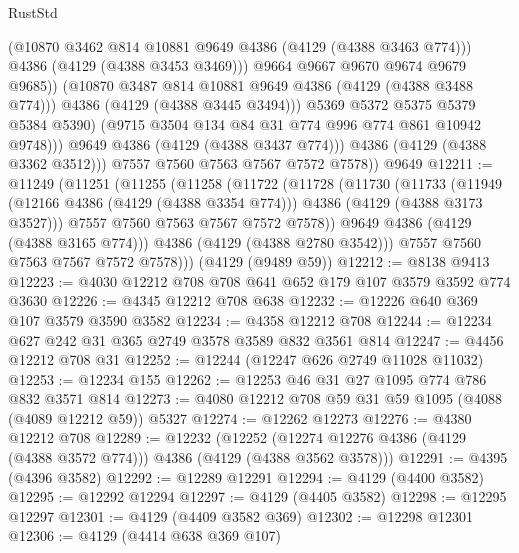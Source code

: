 \begin{lexlean}{RustStd}
\begin{coremodule}
{\begin{coremodule}
{{{{{{{{{{{{{{                          (@10870 @3462 @814 @10881 @9649 @4386 (@4129 (@4388 @3463 @774)))
                          @4386
                          (@4129 (@4388 @3453 @3469)))
                        @9664
                        @9667
                        @9670
                        @9674
                        @9679
                        @9685))
                    (@10870 @3487 @814 @10881 @9649 @4386 (@4129 (@4388 @3488 @774)))
                    @4386
                    (@4129 (@4388 @3445 @3494)))
                  @5369
                  @5372
                  @5375
                  @5379
                  @5384
                  @5390)
                (@9715 @3504 @134 @84 @31 @774 @996 @774 @861 @10942 @9748)))
            @9649
            @4386
            (@4129 (@4388 @3437 @774)))
          @4386
          (@4129 (@4388 @3362 @3512)))
        @7557
        @7560
        @7563
        @7567
        @7572
        @7578))
    @9649
@12211 := @11249
    (@11251
      (@11255
        (@11258
          (@11722
            (@11728
              (@11730
                (@11733
                  (@11949
                    (@12166 @4386 (@4129 (@4388 @3354 @774)))
                    @4386
                    (@4129 (@4388 @3173 @3527)))
                  @7557
                  @7560
                  @7563
                  @7567
                  @7572
                  @7578))
              @9649
              @4386
              (@4129 (@4388 @3165 @774)))
            @4386
            (@4129 (@4388 @2780 @3542)))
          @7557
          @7560
          @7563
          @7567
          @7572
          @7578)))
    (@4129 (@9489 @59))
@12212 := @8138 @9413
@12223 := @4030 @12212 @708 @708 @641 @652 @179 @107 @3579 @3592 @774 @3630
@12226 := @4345 @12212 @708 @638
@12232 := @12226 @640 @369 @107 @3579 @3590 @3582
@12234 := @4358 @12212 @708
@12244 := @12234 @627 @242 @31 @365 @2749 @3578 @3589 @832 @3561 @814
@12247 := @4456 @12212 @708 @31
@12252 := @12244 (@12247 @626 @2749 @11028 @11032)
@12253 := @12234 @155
@12262 := @12253 @46 @31 @27 @1095 @774 @786 @832 @3571 @814
@12273 := @4080 @12212 @708 @59 @31 @59 @1095 (@4088 (@4089 @12212 @59)) @5327
@12274 := @12262 @12273
@12276 := @4380 @12212 @708
@12289 := @12232
    (@12252 (@12274 @12276 @4386 (@4129 (@4388 @3572 @774))) @4386 (@4129 (@4388 @3562 @3578)))
@12291 := @4395 (@4396 @3582)
@12292 := @12289 @12291
@12294 := @4129 (@4400 @3582)
@12295 := @12292 @12294
@12297 := @4129 (@4405 @3582)
@12298 := @12295 @12297
@12301 := @4129 (@4409 @3582 @369)
@12302 := @12298 @12301
@12306 := @4129 (@4414 @638 @369 @107)
}}}}}}}}}}}}}}
\end{coremodule}}
\end{coremodule}
\end{lexlean}
